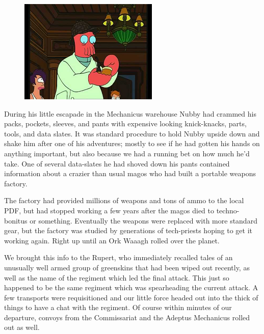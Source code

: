 \begin{figure}
	\begin{center}
		\includegraphics[width=\figwidth]{pics/4/14.png}
	\end{center}
\end{figure}
During his little escapade in the Mechanicus warehouse Nubby had crammed his packs, pockets, sleeves, and pants with expensive looking knick-knacks, parts, tools, and data slates. 
It was standard procedure to hold Nubby upside down and shake him after one of his adventures; 
mostly to see if he had gotten his hands on anything important, but also because we had a running bet on how much he'd take. 
One of several data-slates he had shoved down his pants contained information about a crazier than usual magos who had built a portable weapons factory. 

The factory had provided millions of weapons and tons of ammo to the local PDF, but had stopped working a few years after the magos died to techno-bonitus or something. 
Eventually the weapons were replaced with more standard gear, but the factory was studied by generations of tech-priests hoping to get it working again. 
Right up until an Ork Waaagh rolled over the planet.

We brought this info to the Rupert, who immediately recalled tales of an unusually well armed group of greenskins that had been wiped out recently, as well as the name of the regiment which led the final attack. 
This just so happened to be the same regiment which was spearheading the current attack. 
A few transports were requisitioned and our little force headed out into the thick of things to have a chat with the regiment. 
Of course within minutes of our departure, convoys from the Commissariat and the Adeptus Mechanicus rolled out as well.


